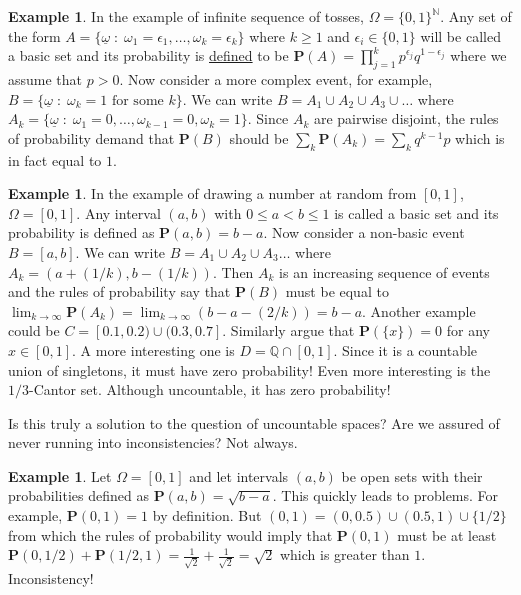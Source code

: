\documentclass[preprint,  11pt]{amsart}
\newcommand{\para}[1]{\vspace{4mm}\noindent{\bfseries #1:}}
\theoremstyle{plain} %
\theoremstyle{definition} %
\newtheorem{example}[theorem]{Example}
\begin{document}
{\begin{example} In the example of infinite sequence of tosses, $\Omega=\{0,1\}^{\mathbb{N}}$. Any set of the form $A=\{\underline{\omega}{\; : \;} \omega_{1}=\epsilon_{1},\ldots ,\omega_{k}=\epsilon_{k}\}$ where $k\ge 1$ and $\epsilon_{i}\in \{0,1\}$ will be called a basic set and its probability is \underline{defined} to be $\mathbf{P}(A)=\prod_{j=1}^{k}p^{\epsilon_{j}}q^{1-\epsilon_{j}}$ where we assume that $p>0$. Now consider a more complex event, for example, $B=\{\underline{\omega} {\; : \;} \omega_{k}=1\mbox{ for some }k\}$. We can write $B=A_{1}\cup A_{2}\cup A_{3}\cup\ldots$ where $A_{k}=\{\underline{\omega}{\; : \;} \omega_{1}=0,\ldots ,\omega_{k-1}=0,\omega_{k}=1\}$. Since $A_{k}$ are pairwise disjoint, the rules of probability demand that $\mathbf{P}(B)$ should be $\sum_{k}\mathbf{P}(A_{k})=\sum_{k}q^{k-1}p$ which is in fact equal to $1$.
\end{example}
\begin{example} In the example of drawing a number at random from $[0,1]$, $\Omega=[0,1]$. Any interval $(a,b)$ with $0\le a<b\le 1$ is called a basic set and its probability is defined as $\mathbf{P}(a,b)=b-a$. Now consider a non-basic event $B=[a,b]$. We can write $B=A_{1}\cup A_{2}\cup A_{3}\ldots$ where $A_{k}=(a+(1/k),b-(1/k))$. Then $A_{k}$ is an increasing sequence of events and the rules of probability say that $\mathbf{P}(B)$ must be equal to $\lim_{k\rightarrow \infty}\mathbf{P}(A_{k})=\lim_{k\rightarrow \infty}(b-a-(2/k)) = b-a$. Another example could be $C=[0.1,0.2)\cup(0.3,0.7]$. Similarly argue that $\mathbf{P}(\{x\})=0$ for any $x\in [0,1]$. A more interesting one is $D=\mathbb Q \cap [0,1]$. Since it is a countable union of singletons, it must have zero probability! Even more interesting is the $1/3$-Cantor set. Although uncountable, it has zero probability!
\end{example}
 
\para{Consistency} Is this truly a solution to the question of uncountable spaces? Are we assured of never running into inconsistencies? Not always. 
\begin{example} Let $\Omega=[0,1]$ and let intervals $(a,b)$ be open sets with their probabilities defined as $\mathbf{P}(a,b)=\sqrt{b-a}$. This quickly leads to problems. For example, $\mathbf{P}(0,1)=1$ by definition. But $(0,1)=(0,0.5)\cup(0.5,1)\cup \{1/2\}$ from which the rules of probability would imply that $\mathbf{P}(0,1)$ must be at least $\mathbf{P}(0,1/2)+\mathbf{P}(1/2,1)=\frac{1}{\sqrt{2}}+\frac{1}{\sqrt{2}}=\sqrt{2}$ which is greater than $1$. Inconsistency!
\end{example}

}
\end{document}
